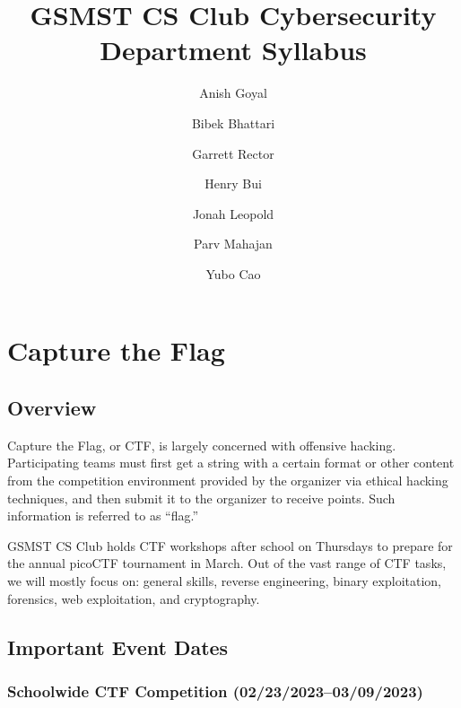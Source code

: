 \documentclass[
  letterpaper,
  DIV=11,
  numbers=noendperiod]{scrartcl}
\title{GSMST CS Club Cybersecurity Department Syllabus}
\author{Anish Goyal \and Bibek Bhattari \and Garrett Rector \and Henry
Bui \and Jonah Leopold \and Parv Mahajan \and Yubo Cao}
\date{}
\renewcommand*\contentsname{Table of contents}
\newcommand\contentsname{Table of contents}
\begin{document}
\maketitle
\ifdefined\Shaded\renewenvironment{Shaded}{\begin{tcolorbox}[interior hidden, boxrule=0pt, borderline west={3pt}{0pt}{shadecolor}, breakable, enhanced, frame hidden, sharp corners]}{\end{tcolorbox}}\fi

\renewcommand*\contentsname{Table of Contents}
{
\hypersetup{linkcolor=}
\setcounter{tocdepth}{6}
\tableofcontents
}
\newpage{}

\hypertarget{capture-the-flag}{%
\section{Capture the Flag}\label{capture-the-flag}}

\hypertarget{overview}{%
\subsection{Overview}\label{overview}}

Capture the Flag, or CTF, is largely concerned with offensive hacking.
Participating teams must first get a string with a certain format or
other content from the competition environment provided by the organizer
via ethical hacking techniques, and then submit it to the organizer to
receive points. Such information is referred to as ``flag.''

GSMST CS Club holds CTF workshops after school on Thursdays to prepare
for the annual picoCTF tournament in March. Out of the vast range of CTF
tasks, we will mostly focus on: general skills, reverse engineering,
binary exploitation, forensics, web exploitation, and cryptography.

\hypertarget{important-event-dates}{%
\subsection{Important Event Dates}\label{important-event-dates}}

\hypertarget{schoolwide-ctf-competition-0223202303092023}{%
\subsubsection{Schoolwide CTF Competition
(02/23/2023--03/09/2023)}\label{schoolwide-ctf-competition-0223202303092023}}
\end{document}
